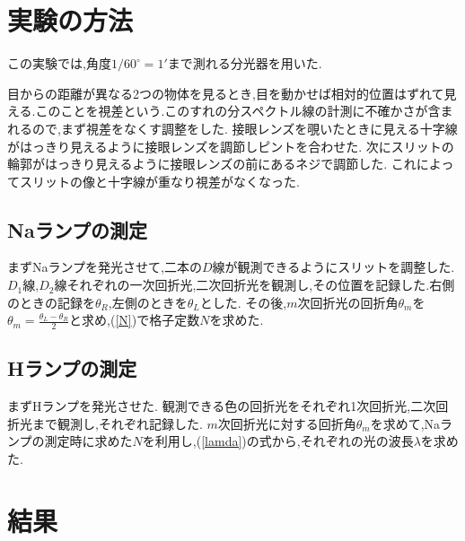\documentclass[a4j,10pt]{jarticle}
\begin{document}
  \section{実験の方法}
  この実験では,角度$1/60^\circ=1'$まで測れる分光器を用いた.

  目からの距離が異なる2つの物体を見るとき,目を動かせば相対的位置はずれて見える.このことを視差という.このすれの分スペクトル線の計測に不確かさが含まれるので,まず視差をなくす調整をした.
  接眼レンズを覗いたときに見える十字線がはっきり見えるように接眼レンズを調節しピントを合わせた.
  次にスリットの輪郭がはっきり見えるように接眼レンズの前にあるネジで調節した.
  これによってスリットの像と十字線が重なり視差がなくなった.


  \subsection{Naランプの測定}
  まずNaランプを発光させて,二本の$D$線が観測できるようにスリットを調整した.
  $D_1$線,$D_2$線それぞれの一次回折光,二次回折光を観測し,その位置を記録した.右側のときの記録を$\theta_R$,左側のときを$\theta_L$とした.
  その後,$m$次回折光の回折角$\theta_m$を$\theta_m=\frac{\theta_L-\theta_R}{2}$と求め,(\ref{N})で格子定数$N$を求めた.
  
  \subsection{Hランプの測定}
  まずHランプを発光させた.
  観測できる色の回折光をそれぞれ1次回折光,二次回折光まで観測し,それぞれ記録した.
  $m$次回折光に対する回折角$\theta_m$を求めて,Naランプの測定時に求めた$N$を利用し,(\ref{lamda})の式から,それぞれの光の波長$\lambda$を求めた.
  \section{結果}
\end{document}
